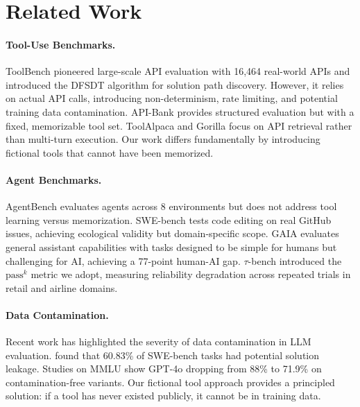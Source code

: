 \documentclass{article}
\newcommand{\passmark}{\text{pass}^k}
\begin{document}
\section{Related Work}
\label{sec:related}

\paragraph{Tool-Use Benchmarks.} ToolBench \citep{toolbench2023} pioneered large-scale API evaluation with 16,464 real-world APIs and introduced the DFSDT algorithm for solution path discovery. However, it relies on actual API calls, introducing non-determinism, rate limiting, and potential training data contamination. API-Bank \citep{api-bank2023} provides structured evaluation but with a fixed, memorizable tool set. ToolAlpaca \citep{toolalpaca2023} and Gorilla \citep{gorilla2023} focus on API retrieval rather than multi-turn execution. Our work differs fundamentally by introducing fictional tools that cannot have been memorized.

\paragraph{Agent Benchmarks.} AgentBench \citep{agentbench2023} evaluates agents across 8 environments but does not address tool learning versus memorization. SWE-bench \citep{swebench2024} tests code editing on real GitHub issues, achieving ecological validity but domain-specific scope. GAIA \citep{gaia2023} evaluates general assistant capabilities with tasks designed to be simple for humans but challenging for AI, achieving a 77-point human-AI gap. $\tau$-bench \citep{taubench2024} introduced the $\passmark$ metric we adopt, measuring reliability degradation across repeated trials in retail and airline domains.

\paragraph{Data Contamination.} Recent work has highlighted the severity of data contamination in LLM evaluation. \citet{swebench2024} found that 60.83\% of SWE-bench tasks had potential solution leakage. Studies on MMLU show GPT-4o dropping from 88\% to 71.9\% on contamination-free variants. Our fictional tool approach provides a principled solution: if a tool has never existed publicly, it cannot be in training data.
\end{document}
